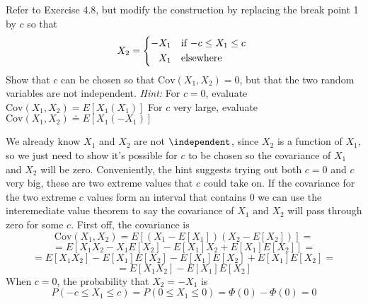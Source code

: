 Refer to Exercise 4.8, but modify the construction by replacing the break point 1 by $c$ so that
\[
    X_2
    =
    \begin{cases*}
        -X_1 & if $-c \leq X_1 \leq c$ \\
        \phantom{-}X_1 & elsewhere
    \end{cases*}
\]
Show that $c$ can be chosen so that $\text{Cov}(X_1,X_2) = 0$, but that the two random variables are not independent.
\newline
\textit{Hint:}
\newline
For $c = 0$, evaluate $\text{Cov}(X_1,X_2) = E[X_1(X_1)]$
\newline
For $c$ very large, evaluate $\text{Cov}(X_1,X_2) \doteq E[X_1(-X_1)]$
\newline
\par
We already know $X_1$ and $X_2$ are not $\independent$, since $X_2$ is a function of $X_1$, so we just need to show it's possible for $c$ to be chosen so the covariance of $X_1$ and $X_2$ will be zero. Conveniently, the hint suggests trying out both $c = 0$ and $c$ very big, these are two extreme values that $c$ could take on. If the covariance for the two extreme $c$ values form an interval that contains 0 we can use the interemediate value theorem to say the covariance of $X_1$ and $X_2$ will pass through zero for some $c$.
\newline
First off, the covariance is
\[
    \text{Cov}(X_1, X_2)
    =
    E\left[
        \left(X_1 - E[X_1]\right)
        \left(X_2 - E[X_2]\right)
    \right]
    =
\]
\[
    =
    E\left[
        X_1 X_2
        -
        X_1 E[X_2]
        -
        E[X_1] X_2
        +
        E[X_1] E[X_2]
    \right]
    =
\]
\[
    =
    E[X_1 X_2]
    -
    E[X_1] E[X_2]
    -
    E[X_1] E[X_2]
    +
    E[X_1] E[X_2]
    =
\]
\[
    =
    E[X_1 X_2]
    -
    E[X_1] E[X_2]
\]
When $c = 0$, the probability that $X_2 = -X_1$ is
\[
    P(-c \leq X_1 \leq c)
    =
    P(0 \leq X_1 \leq 0)
    =
    \Phi (0) - \Phi(0)
    =
    0
\]

